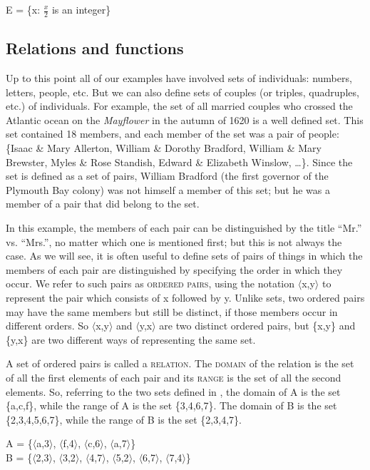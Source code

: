 \ea \label{ex:13.6}
E = \{x: $\frac{x}{2}$ is an integer\}
\z

\subsection{Relations and functions}\label{sec:13.3.1}

Up to this point all of our examples have involved sets of individuals: numbers, letters, people, etc. But we can also define sets of couples (or triples, quadruples, etc.) of individuals. For example, the set of all married couples who crossed the Atlantic ocean on the \textit{Mayflower} in the autumn of 1620 is a well defined set. This set contained 18 members, and each member of the set was a pair of people: \{Isaac \& Mary Allerton, William \& Dorothy Bradford, William \& Mary Brewster, Myles \& Rose Standish, Edward \& Elizabeth Winslow, …\}. Since the set is defined as a set of pairs, William Bradford (the first governor of the Plymouth Bay colony) was not himself a member of this set; but he was a member of a pair that did belong to the set.



In this example, the members of each pair can be distinguished by the title “Mr.” vs. “Mrs.”, no matter which one is mentioned first; but this is not always the case. As we will see, it is often useful to define sets of pairs of things in which the members of each pair are distinguished by specifying the order in which they occur. We refer to such pairs as \textsc{ordered pairs}, using the notation $\langle$x,y$\rangle$ to represent the pair which consists of x followed by y. Unlike sets, two ordered pairs may have the same members but still be distinct, if those members occur in different orders. So $\langle$x,y$\rangle$ and $\langle$y,x$\rangle$ are two distinct ordered pairs, but \{x,y\} and \{y,x\} are two different ways of representing the same set.



A set of ordered pairs is called a \textsc{relation}. The \textsc{domain} of the relation is the set of all the first elements of each pair and its \textsc{range} is the set of all the second elements. So, referring to the two sets defined in , the domain of A is the set \{a,c,f\}, while the range of A is the set \{3,4,6,7\}. The domain of B is the set \{2,3,4,5,6,7\}, while the range of B is the set \{2,3,4,7\}. 


\ea \label{ex:13.7}
A = \{$\langle$a,3$\rangle$, $\langle$f,4$\rangle$, $\langle$c,6$\rangle$, $\langle$a,7$\rangle$\}\\
B = \{$\langle$2,3$\rangle$, $\langle$3,2$\rangle$, $\langle$4,7$\rangle$, $\langle$5,2$\rangle$, $\langle$6,7$\rangle$, $\langle$7,4$\rangle$\}
\z


